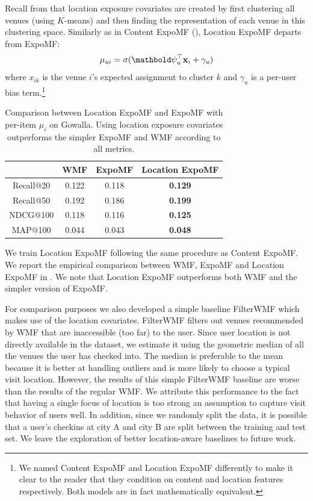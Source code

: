 Recall from  that location exposure covariates are created
by first clustering all venues (using $K$-means) and then finding the
representation of each venue in this clustering space. Similarly as in Content
ExpoMF (), Location ExpoMF departs from ExpoMF:
\begin{displaymath} \mu_{ui}= \sigma(\mb\psi_u^\top \mathbf{x}_i + \gamma_u)\end{displaymath}
where $x_{ik}$ is the venue $i$'s expected assignment to cluster $k$ and
$\gamma_u$ is a per-user bias term.\footnote{We named Content ExpoMF
and Location ExpoMF differently to make it clear to the reader that they
condition on content and location features respectively. Both models are
in fact mathematically equivalent.}

\begin{table}
\centering
\begin{tabular}{c c c c}
\hline
            & WMF & ExpoMF & Location ExpoMF \\ \hline
  Recall@20 & 0.122 & 0.118 & \textbf{0.129} \\
  Recall@50 & 0.192 & 0.186 & \textbf{0.199} \\
  NDCG@100  & 0.118 & 0.116 & \textbf{0.125} \\
  MAP@100   & 0.044 & 0.043 & \textbf{0.048} \\
\hline
\end{tabular}
\caption{Comparison between Location ExpoMF and ExpoMF with per-item
$\mu_i$ on Gowalla. Using location exposure covariates outperforms the
simpler ExpoMF and WMF according to all metrics.}
\label{tab:si_location_results}
\end{table}



 We train Location ExpoMF following the same procedure as
Content ExpoMF. We report the empirical comparison between WMF, ExpoMF and
Location ExpoMF in . We note that Location
ExpoMF outperforms both WMF and the simpler version of ExpoMF. 

For comparison purposes we also developed a simple baseline FilterWMF which makes use of the
location covariates. FilterWMF filters out venues recommended by WMF that are inaccessible (too far) to the user. Since user
location is not directly available in the dataset, we estimate it using the
geometric median of all the venues the user has checked into. 
The median is preferable to the mean because it is better at handling outliers and is more likely to choose a typical visit location. 
However, the results of this simple FilterWMF baseline are worse than the results of the
regular WMF. We attribute this performance to the fact that having a single focus of location 
is too strong an assumption to capture visit behavior of users well. 
In addition, since we randomly split the data, it is possible that a user's
checkins at city A and city B are split between the training and test set.
We leave the exploration of better location-aware baselines to future work. 


